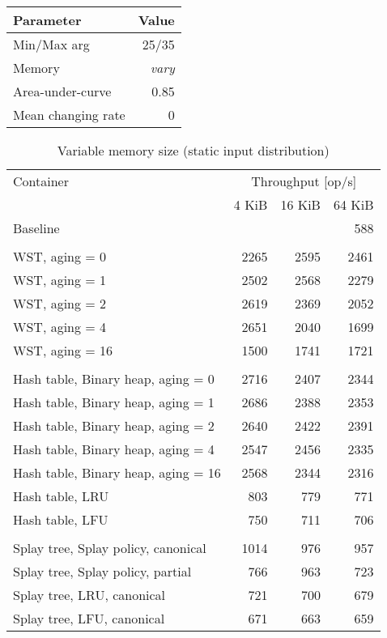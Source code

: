 \pagebreak

\begin{tabular}[h]{l r} \toprule
Parameter & Value \\ \midrule
Min/Max arg & 25/35 \\
Memory & \emph{vary} \\
Area-under-curve & 0.85 \\
Mean changing rate & 0 \\ \bottomrule
\end{tabular}

\begin{table}
\caption{Variable memory size (static input distribution)}
\begin{tabular}[]{l  r  r  r } \toprule
Container & \multicolumn{3}{c}{Throughput [op/s]} \\ \cmidrule(r){2-4}
& 4 KiB & 16 KiB & 64 KiB \\ \midrule
Baseline & \multicolumn{3}{r}{588}  \\
\\
WST, aging = 0 & 2265 & 2595 & 2461 \\
WST, aging = 1 & 2502 & 2568 & 2279 \\
WST, aging = 2 & 2619 & 2369 & 2052 \\
WST, aging = 4 & 2651 & 2040 & 1699 \\
WST, aging = 16 & 1500 & 1741 & 1721 \\
\\
Hash table, Binary heap, aging = 0 & 2716 & 2407 & 2344 \\
Hash table, Binary heap, aging = 1 & 2686 & 2388 & 2353 \\
Hash table, Binary heap, aging = 2 & 2640 & 2422 & 2391 \\
Hash table, Binary heap, aging = 4 & 2547 & 2456 & 2335 \\
Hash table, Binary heap, aging = 16 & 2568 & 2344 & 2316 \\
Hash table, LRU & 803 & 779 & 771 \\
Hash table, LFU & 750 & 711 & 706 \\
\\
Splay tree, Splay policy, canonical & 1014 & 976 & 957 \\
Splay tree, Splay policy, partial & 766 & 963 & 723 \\
Splay tree, LRU, canonical & 721 & 700 & 679 \\
Splay tree, LFU, canonical & 671 & 663 & 659 \\
\bottomrule
\end{tabular}
\end{table}


